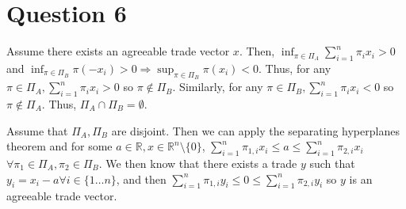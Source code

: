 \documentclass[11pt]{article} %
\begin{document}
\section{Question 6}
Assume there exists an agreeable trade vector $x$. Then, $\inf_{\pi \in \Pi_A}\sum_{i=1}^n \pi_ix_i>0$ and $\inf_{\pi \in \Pi_B} \pi(-x_i)>0 \Rightarrow \sup_{\pi \in \Pi_B} \pi(x_i)<0$. Thus, for any $\pi\in \Pi_A, \sum_{i=1}^n \pi_ix_i>0$ so $\pi \notin \Pi_B$. Similarly, for any $\pi\in \Pi_B, \sum_{i=1}^n \pi_ix_i<0$ so $\pi \notin \Pi_A$. Thus, $\Pi_A \cap \Pi_B = \emptyset$.%

Assume that $\Pi_A,\Pi_B$ are disjoint. Then we can apply the separating hyperplanes theorem and for some $a\in\mathbb{R},x \in\mathbb{R}^n\setminus \{0\}$, $\sum_{i=1}^n\pi_{1,i}x_i\leq a \leq\sum_{i=1}^n\pi_{2,i}x_i$ $\forall \pi_1 \in \Pi_A,\pi_2 \in \Pi_B.$ We then know that there exists a trade $y$ such that $y_i = x_i-a \forall i \in \{1 \dots n \}$, and then $\sum_{i=1}^n\pi_{1,i}y_i\leq 0 \leq\sum_{i=1}^n\pi_{2,i}y_i$ so $y$ is an agreeable trade vector.
\end{document}
